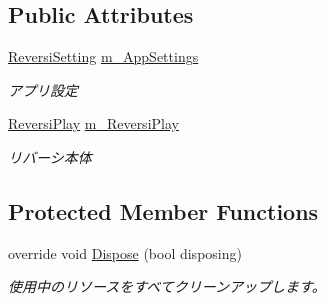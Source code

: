\subsection*{Public Attributes}
\begin{DoxyCompactItemize}
\item 
\mbox{\label{class_reversi4color_form_1_1_reversi_acf0a86323b8a7494bc65dcb9945e19c1}} 
\hyperlink{class_reversi4color_form_1_1_reversi_setting}{Reversi\+Setting} \hyperlink{class_reversi4color_form_1_1_reversi_acf0a86323b8a7494bc65dcb9945e19c1}{m\+\_\+\+App\+Settings}
\begin{DoxyCompactList}\small\item\em アプリ設定 \end{DoxyCompactList}\item 
\mbox{\label{class_reversi4color_form_1_1_reversi_ae82e78a9e55c65e5909715b5eb1ec1e1}} 
\hyperlink{class_reversi4color_form_1_1_reversi_play}{Reversi\+Play} \hyperlink{class_reversi4color_form_1_1_reversi_ae82e78a9e55c65e5909715b5eb1ec1e1}{m\+\_\+\+Reversi\+Play}
\begin{DoxyCompactList}\small\item\em リバーシ本体 \end{DoxyCompactList}\end{DoxyCompactItemize}
\subsection*{Protected Member Functions}
\begin{DoxyCompactItemize}
\item 
override void \hyperlink{class_reversi4color_form_1_1_reversi_aa6fa1c8eae6d12a2e4f310ef0acddbb1}{Dispose} (bool disposing)
\begin{DoxyCompactList}\small\item\em 使用中のリソースをすべてクリーンアップします。 \end{DoxyCompactList}\end{DoxyCompactItemize}
